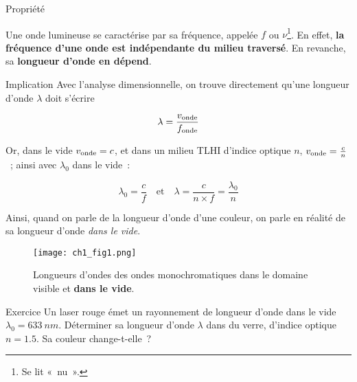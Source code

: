 \documentclass[../main/main.tex]{subfiles}
\begin{document}
\begin{tcbraster}[raster columns=3, raster equal height=rows]
    \begin{NCprop}[]{Propriété}

        Une onde lumineuse se caractérise par sa fréquence, appelée $f$ ou
        $\nu$\footnote{Se lit «~nu~».}. En effet, \textbf{la fréquence d'une
        onde est indépendante du milieu traversé}. En revanche, sa
        \textbf{longueur d'onde en dépend}.

    \end{NCprop}
    \begin{NCimpl}[raster multicolumn=2]{Implication}
        Avec l'analyse dimensionnelle, on trouve directement qu'une longueur
        d'onde $\lambda$ doit s'écrire

        \[\lambda = \frac{v_{\rm onde}}{f_{\rm onde}}\]
    
        Or, dans le vide $v_{\rm onde} = c$, et dans un milieu TLHI d'indice
        optique $n$, $v_{\rm onde} = \frac{c}{n}$~; ainsi avec $\lambda_0$ dans
        le vide~:
    
        \begin{equation*}
            \boxed{\lambda_0 = \frac{c}{f}}
            \quad\text{et}\quad
            \boxed{\lambda = \frac{c}{n\times f} = \frac{\lambda_0}{n}}
        \end{equation*}
    \end{NCimpl}
\end{tcbraster}

Ainsi, quand on parle de la longueur d'onde d'une couleur, on parle en réalité
de sa longueur d'onde \textit{dans le vide}.

\begin{figure}[h]
    \centering
    \texttt{[image: ch1\_fig1.png]}
    \captionsetup{justification=centering}
    \caption{Longueurs d'ondes des ondes monochromatiques dans le domaine
    visible et \textbf{dans le vide}.}
    \label{fig:lambda_vis}
\end{figure}

\begin{NCexem}[]{Exercice}
    Un laser rouge émet un rayonnement de longueur d'onde dans le vide
    $\lambda_0 = \SI{633}{nm}$. Déterminer sa longueur d'onde $\lambda$ dans du
    verre, d'indice optique $n = \num{1.5}$. Sa couleur change-t-elle~?
    \tcblower
    \vspace{2cm}
\end{NCexem}
\end{document}
